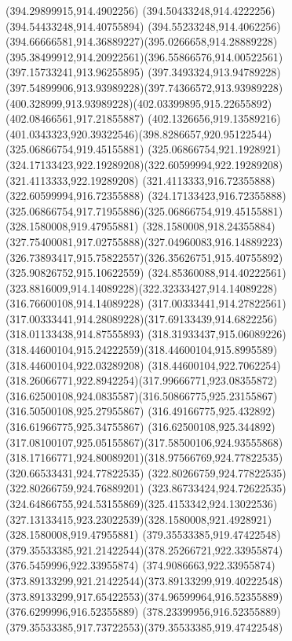 {{{{				\lineto(394.29899915,914.4902256)
				\lineto(394.50433248,914.4222256)
				\lineto(394.54433248,914.40755894)
				\curveto(394.55233248,914.4062256)(394.66666581,914.36889227)(395.0266658,914.28889228)
				\curveto(395.38499912,914.20922561)(396.55866576,914.00522561)(397.15733241,913.96255895)
				\curveto(397.3493324,913.94789228)(397.54899906,913.93989228)(397.74366572,913.93989228)
				\curveto(400.328999,913.93989228)(402.03399895,915.22655892)(402.08466561,917.21855887)
				\curveto(402.1326656,919.13589216)(401.0343323,920.39322546)(398.8286657,920.95122544)
				\moveto(325.06866754,919.45155881)
				\curveto(325.06866754,921.1928921)(324.17133423,922.19289208)(322.60599994,922.19289208)
				\lineto(321.4113333,922.19289208)
				\lineto(321.4113333,916.72355888)
				\lineto(322.60599994,916.72355888)
				\curveto(324.17133423,916.72355888)(325.06866754,917.71955886)(325.06866754,919.45155881)
				\moveto(328.1580008,919.47955881)
				\curveto(328.1580008,918.24355884)(327.75400081,917.02755888)(327.04960083,916.14889223)
				\curveto(326.73893417,915.75822557)(326.35626751,915.40755892)(325.90826752,915.10622559)
				\curveto(324.85360088,914.40222561)(323.8816009,914.14089228)(322.32333427,914.14089228)
				\lineto(316.76600108,914.14089228)
				\lineto(317.00333441,914.27822561)
				\curveto(317.00333441,914.28089228)(317.69133439,914.6822256)(318.01133438,914.87555893)
				\curveto(318.31933437,915.06089226)(318.44600104,915.24222559)(318.44600104,915.8995589)
				\lineto(318.44600104,922.03289208)
				\curveto(318.44600104,922.7062254)(318.26066771,922.8942254)(317.99666771,923.08355872)
				\curveto(316.62500108,924.0835587)(316.50866775,925.23155867)(316.50500108,925.27955867)
				\lineto(316.49166775,925.432892)
				\lineto(316.61966775,925.34755867)
				\curveto(316.62500108,925.344892)(317.08100107,925.05155867)(317.58500106,924.93555868)
				\curveto(318.17166771,924.80089201)(318.97566769,924.77822535)(320.66533431,924.77822535)
				\lineto(322.80266759,924.77822535)
				\lineto(322.80266759,924.76889201)
				\curveto(323.86733424,924.72622535)(324.64866755,924.53155869)(325.4153342,924.13022536)
				\curveto(327.13133415,923.23022539)(328.1580008,921.4928921)(328.1580008,919.47955881)
				\moveto(379.35533385,919.47422548)
				\curveto(379.35533385,921.21422544)(378.25266721,922.33955874)(376.5459996,922.33955874)
				\curveto(374.9086663,922.33955874)(373.89133299,921.21422544)(373.89133299,919.40222548)
				\curveto(373.89133299,917.65422553)(374.96599964,916.52355889)(376.6299996,916.52355889)
				\curveto(378.23399956,916.52355889)(379.35533385,917.73722553)(379.35533385,919.47422548)
}}}}

